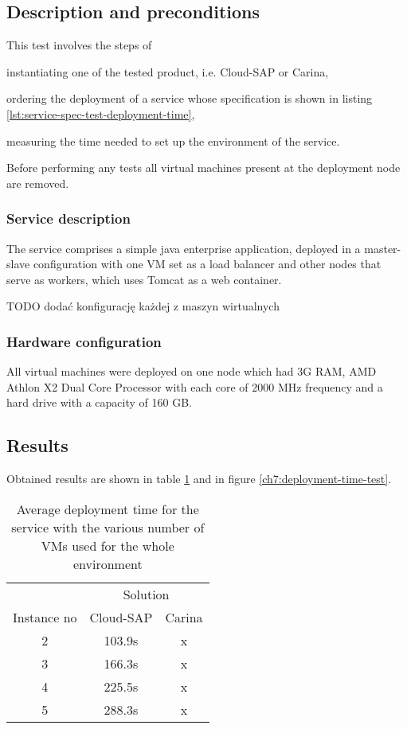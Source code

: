 \subsection{Description and preconditions}
This test involves the steps of
  \begin{inparaenum}[i)]
    \item instantiating one of the tested product, i.e. Cloud-SAP or Carina,
    \item ordering the deployment of a service whose specification is shown in listing \ref{lst:service-spec-test-deployment-time},
    \item measuring the time needed to set up the environment of the service.
  \end{inparaenum}
Before performing any tests all virtual machines present at the deployment node are removed.
\subsubsection{Service description}
The service comprises a simple java enterprise application, deployed in a master-slave configuration with one VM set as a load balancer and other nodes that serve as workers, which uses Tomcat as a web container.

TODO dodać konfigurację każdej z maszyn wirtualnych
\subsubsection{Hardware configuration}
All virtual machines were deployed on one node which had 3G RAM, AMD Athlon X2 Dual Core Processor with each core of 2000 MHz frequency and a hard drive with a capacity of 160 GB.
\subsection{Results}
Obtained results are shown in table \ref{tbl:test-service-deployment-time} and in figure \ref{ch7:deployment-time-test}.

\begin{table}
  \centering
  \begin{tabular}{ c  c  c }
    \hline
    & \multicolumn{2}{c}{Solution} \\
    \cline{2-3}
    Instance no & Cloud-SAP & Carina \\
    \hline
    2 & 103.9s & x \\
    3 & 166.3s & x \\
    4 & 225.5s & x \\
    5 & 288.3s & x \\
    \hline
  \end{tabular}
  \caption{Average deployment time for the service with the various number of VMs used for the whole environment}
  \label{tbl:test-service-deployment-time}
\end{table}

